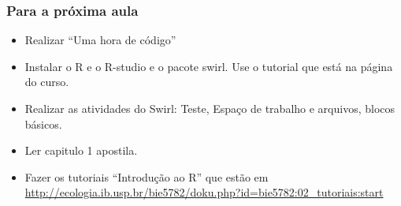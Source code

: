 \documentclass[handout]{beamer}
\begin{document}
\begin{frame}
  \frametitle{Para a próxima aula}
  \begin{itemize}
    \item Realizar ``Uma hora de código''
    \item Instalar o R e o R-studio e o pacote swirl. Use o  tutorial que está na página do curso.
    \item Realizar as atividades do Swirl: Teste, Espaço de trabalho e arquivos, blocos básicos. 
    \item Ler capitulo 1 apostila.
    \item  Fazer os tutoriais ``Introdução ao R'' que estão em \url{http://ecologia.ib.usp.br/bie5782/doku.php?id=bie5782:02_tutoriais:start}
  \end{itemize}
  
\end{frame}
\end{document}
